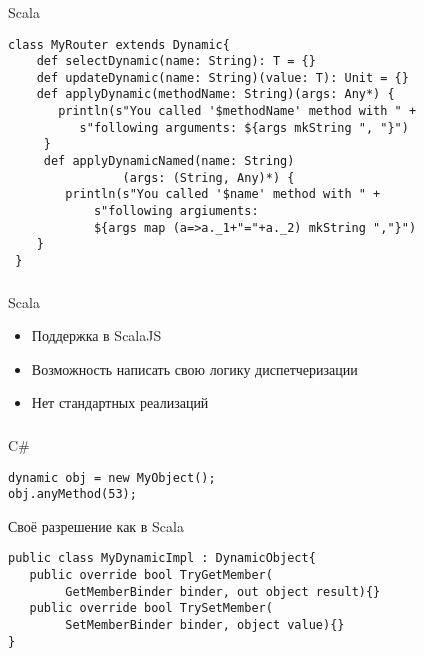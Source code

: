 \documentclass[t]{beamer}  %
\newcommand\pro{\item[$+$]} 		%
\newcommand\con{\item[$-$]} 		%
\begin{document}
\begin{frame}[fragile]
	\frametitle{\insertsection} 
    \framesubtitle{\insertsubsection}
\begin{block}{Scala}
	\begin{verbatim}
class MyRouter extends Dynamic{
    def selectDynamic(name: String): T = {}
    def updateDynamic(name: String)(value: T): Unit = {}
    def applyDynamic(methodName: String)(args: Any*) {
       println(s"You called '$methodName' method with " +
          s"following arguments: ${args mkString ", "}")
     }
     def applyDynamicNamed(name: String)
     			(args: (String, Any)*) {
        println(s"You called '$name' method with " +
            s"following argiuments: 
            ${args map (a=>a._1+"="+a._2) mkString ","}")
    }
 }
	\end{verbatim}
\end{block}
\end{frame}

\begin{frame}[fragile]
	\frametitle{\insertsection} 
    \framesubtitle{\insertsubsection}
\begin{block}{Scala}
\begin{itemize}
        \pro Поддержка в ScalaJS
        \pro Возможность написать свою логику диспетчеризации
        \con Нет стандартных реализаций
   \end{itemize}
\end{block}
\end{frame}


\begin{frame}[fragile]
	\frametitle{\insertsection} 
    \framesubtitle{\insertsubsection}
	\begin{block}{C\#}
		\begin{verbatim}
dynamic obj = new MyObject();
obj.anyMethod(53);
		\end{verbatim}
	\end{block}
   	\begin{block}{Своё разрешение как в Scala}
		\begin{verbatim}
public class MyDynamicImpl : DynamicObject{
   public override bool TryGetMember(
        GetMemberBinder binder, out object result){}
   public override bool TrySetMember(
        SetMemberBinder binder, object value){}
}
        \end{verbatim}
	\end{block}
\end{frame}
\end{document}
